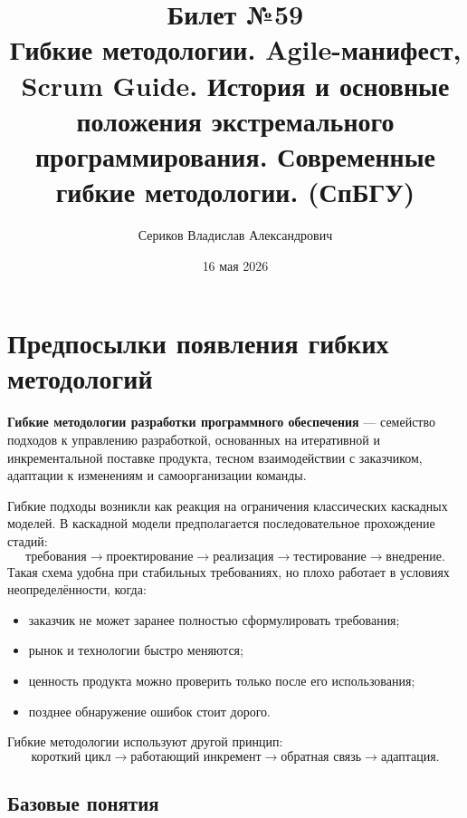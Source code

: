\documentclass[12pt,a4paper]{article}
\title{Билет №59 \\ \small Гибкие методологии. Agile-манифест, Scrum Guide. История и основные положения экстремального программирования. Современные гибкие методологии. (СпБГУ)}
\author{Сериков Владислав Александрович}
\date{16 мая 2026}
\begin{document}
\maketitle
\tableofcontents
\newpage

\section{Предпосылки появления гибких методологий}

\textbf{Гибкие методологии разработки программного обеспечения} --- семейство подходов к управлению разработкой, основанных на итеративной и инкрементальной поставке продукта, тесном взаимодействии с заказчиком, адаптации к изменениям и самоорганизации команды.

Гибкие подходы возникли как реакция на ограничения классических каскадных моделей. В каскадной модели предполагается последовательное прохождение стадий:
\[
\text{требования} \rightarrow \text{проектирование} \rightarrow \text{реализация} \rightarrow \text{тестирование} \rightarrow \text{внедрение}.
\]
Такая схема удобна при стабильных требованиях, но плохо работает в условиях неопределённости, когда:
\begin{itemize}
    \item заказчик не может заранее полностью сформулировать требования;
    \item рынок и технологии быстро меняются;
    \item ценность продукта можно проверить только после его использования;
    \item позднее обнаружение ошибок стоит дорого.
\end{itemize}

Гибкие методологии используют другой принцип:
\[
\text{короткий цикл} \rightarrow \text{работающий инкремент} \rightarrow \text{обратная связь} \rightarrow \text{адаптация}.
\]

\subsection{Базовые понятия}
\end{document}
